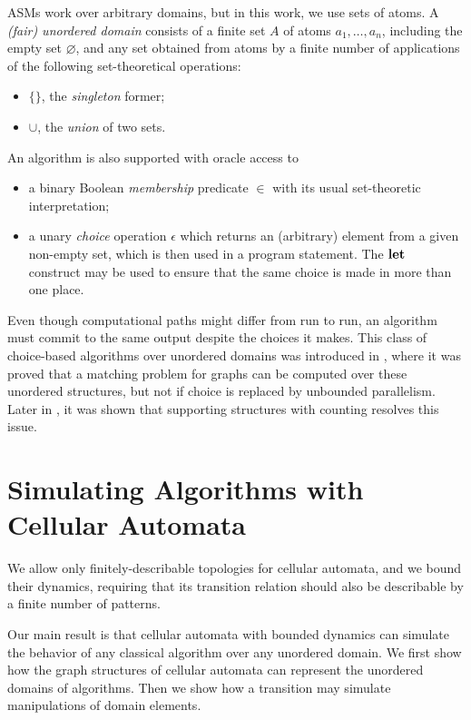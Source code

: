 \documentclass[submission,copyright,creativecommons,english]{eptcs}
\newcommand{\LET}{\mbox{\bf let}\;}
\newcommand{\Choose}{\epsilon}   \newcommand{\TheUnique}{\;\mbox{\bf TheUnique}\;}
\begin{document}
ASMs work over arbitrary domains, but in this work, we use sets of atoms.
A \emph{(fair) unordered domain} consists of a finite set $A$ of atoms $a_1,\ldots, a_n$, including the empty set $\varnothing$, and any set obtained from atoms by a finite number of applications of the following set-theoretical operations:
\begin{itemize}
\item $\{\}$, the \emph{singleton} former;
\item $\cup$, the \emph{union} of two sets.
\end{itemize}
An algorithm is also supported with oracle access to
\begin{itemize}
 \item a binary Boolean \emph{membership} predicate $\in$ with its usual set-theoretic interpretation;
 \item a unary \emph{choice} operation $\Choose$ which returns an (arbitrary) element from a given non-empty set, which is then used in a program statement.
{The $\LET$ construct may be used to ensure that the same choice is made in more than one place.} 
 \end{itemize}
 
Even though computational paths might differ from run to run, an algorithm must commit to the same  output despite the choices it makes.
This class of choice-based algorithms over unordered domains was introduced in \cite{BGS-CPT}, where it was  proved that a matching problem for graphs can be computed over these unordered structures, but not if  choice is replaced by  unbounded  parallelism.
Later in \cite{BGS}, it was shown that supporting structures with counting resolves this issue.

\section{Simulating Algorithms with Cellular Automata}

We allow  only finitely-describable  topologies for cellular automata, and we  bound their dynamics, requiring that its  transition relation should also be describable by a finite number of patterns. 

Our main result is that cellular automata with bounded dynamics can simulate the behavior of  any classical algorithm over any unordered domain.
We first show how the graph structures of cellular automata can represent the unordered domains of  algorithms. Then we show 
how a transition may simulate manipulations of domain elements.
\end{document}
